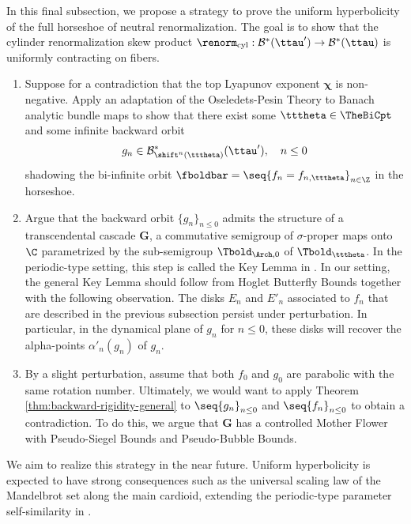 \documentclass{amsart}
\begin{document}
In this final subsection, we propose a strategy to prove the uniform hyperbolicity of the full horseshoe of neutral renormalization.
The goal is to show that the cylinder renormalization skew product $\renorm_{\textnormal{cyl}}: \mathcal{B}^*(\ttau') \to \mathcal{B}^*(\ttau)$ 
is uniformly contracting on fibers.
\begin{enumerate}
    \item Suppose for a contradiction that the top Lyapunov exponent $\boldsymbol{\chi}$ is non-negative.
    Apply an adaptation of the Oseledets-Pesin Theory to Banach analytic bundle maps to show that there exist some $\tttheta \in \TheBiCpt$ and some infinite backward orbit 
    \[
    g_{n} \in \mathcal{B}^*_{\shift^{n}(\tttheta)}(\ttau'), \quad n \leq 0
    \]
    shadowing the bi-infinite orbit $\fboldbar = \seq{f_n = f_{n,\tttheta}}_{n \in \Z}$ in the horseshoe.
    \item Argue that the backward orbit $\{g_n\}_{n\leq 0}$ admits the structure of a transcendental cascade $\mathbf{G}$, a commutative semigroup of $\sigma$-proper maps onto $\C$ parametrized by the sub-semigroup $\Tbold_{\Arch,0}$ of $\Tbold_{\tttheta}$.
    In the periodic-type setting, this step is called the Key Lemma in \cite{DLS}.
    In our setting, the general Key Lemma should follow from Hoglet Butterfly Bounds together with the following observation. 
    The disks $E_n$ and $E'_n$ associated to $f_n$ that are described in the previous subsection persist under perturbation.
    In particular, in the dynamical plane of $g_n$ for $n \leq 0$, these disks will recover the alpha-points $\alpha'_n(g_n)$ of $g_n$.
    \item By a slight perturbation, assume that both $f_0$ and $g_0$ are parabolic with the same rotation number. 
    Ultimately, we would want to apply Theorem \ref{thm:backward-rigidity-general} to $\seq{g_n}_{n \leq 0}$ and $\seq{f_n}_{n \leq 0}$ to obtain a contradiction.
    To do this, we argue that $\mathbf{G}$ has a controlled Mother Flower with Pseudo-Siegel Bounds and Pseudo-Bubble Bounds.
\end{enumerate}
We aim to realize this strategy in the near future.
Uniform hyperbolicity is expected to have strong consequences such as the universal scaling law of the Mandelbrot set along the main cardioid, extending the periodic-type parameter self-similarity in \cite{DLS}.

\end{document}
